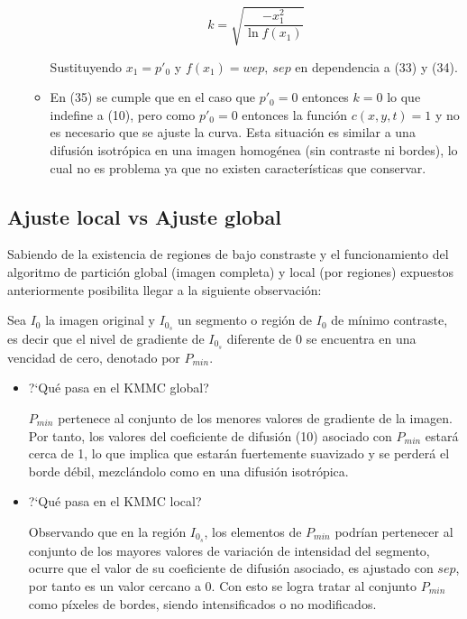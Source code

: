 \documentclass[a4paper,10pt,twocolumn]{article}
\begin{document}
\begin{enumerate}
\begin{itemize}
\begin{equation}
	k = \sqrt{\frac{-x_1^2}{\ln {f(x_1)}}}
\end{equation}

Sustituyendo $x_1 = p'_0$ y $f(x_1) = {wep,\ sep}$ en dependencia a (33) y (34).

\item En (35) se cumple que en el caso que $p'_0 = 0$ entonces $k=0$ lo que indefine a (10), pero como $p'_0=0$ entonces la funci\'on $c(x,y,t)=1$ y no es necesario que se ajuste la curva. Esta situaci\'on es similar a una difusi\'on isotr\'opica en una imagen homog\'enea (sin contraste ni bordes), lo cual no es problema ya que no existen caracter\'isticas que conservar.
\end{itemize}

\end{enumerate}

\subsection{Ajuste local vs Ajuste global}\label{sec:ajuste_local_ajuste_global}

Sabiendo de la existencia de regiones de bajo constraste y el funcionamiento del algoritmo de partici\'on global (imagen completa) y local (por regiones) expuestos anteriormente posibilita llegar a la siguiente observaci\'on:

Sea $I_0$ la imagen original y $I_{0_s}$ un segmento o regi\'on de $I_0$ de m\'inimo contraste, es decir que el nivel de gradiente de $I_{0_s}$ diferente de 0 se encuentra en una vencidad de cero, denotado por $P_{min}$.

\begin{itemize}
\item ?`Qu\'e pasa en el KMMC global?

$P_{min}$ pertenece al conjunto de los menores valores de gradiente de la imagen. Por tanto, los valores del coeficiente de difusi\'on (10) asociado con $P_{min}$ estar\'a cerca de 1, lo que implica que estar\'an fuertemente suavizado y se perder\'a el borde d\'ebil, mezcl\'andolo como en una difusi\'on isotr\'opica.

\item ?`Qu\'e pasa en el KMMC local?

Observando que en la regi\'on $I_{0_s}$, los elementos de $P_{min}$ podr\'ian pertenecer al conjunto de los mayores valores de variaci\'on de intensidad del segmento, ocurre que el valor de su coeficiente de difusi\'on asociado, es ajustado con $sep$, por tanto es un valor cercano a 0. Con esto se logra tratar al conjunto $P_{min}$ como p\'ixeles de bordes, siendo intensificados o no modificados.
\end{itemize}
\end{document}
